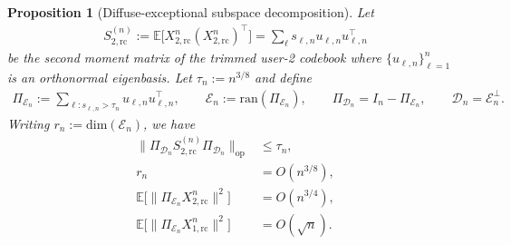 \documentclass[11pt,onecolumn]{IEEEtran}
\newcommand{\calD}{\mathcal{D}}
\newcommand{\calE}{\mathcal{E}}
\newcommand{\bbE}{\mathbb{E}}
\newtheorem{proposition}[theorem]{Proposition}
\newcommand{\rc}{\mathrm{rc}}
\begin{document}
\begin{proposition}[Diffuse-exceptional subspace decomposition] \label{prop:diffuse_exc}
    Let 
    \begin{align}
    S_{2,\rc}^{(n)} := \bbE\big[X_{2,\rc}^n(X_{2,\rc}^n)^\top\big]=\sum_\ell s_{\ell,n}u_{\ell,n}u_{\ell,n}^\top    
    \end{align}
    be the second moment matrix of the trimmed user-2 codebook  where $\{u_{\ell,n}\}_{\ell=1}^n$ is an orthonormal eigenbasis. Let $\tau_n:=n^{3/8}$ and define 
    \begin{align}
        \Pi_{\calE_n}:=\sum_{\ell : s_{\ell,n}> \tau_n}u_{\ell,n}u_{\ell,n}^\top,\qquad \calE_n:=\mathrm{ran}(\Pi_{\calE_n}),\qquad \Pi_{\calD_n}=I_n-\Pi_{\calE_n},\qquad \calD_n=\calE_n^\perp.
    \end{align}
    Writing $r_n :=\mathrm{dim}(\calE_n)$, we have
    \begin{align}
        \| \Pi_{\calD_n}S_{2,\rc}^{(n)} \Pi_{\calD_n}\|_{\mathrm{op}} &\le\tau_n ,\label{eqn:bound_by_tau}\\
        r_n &=O(n^{3/8}),\label{eqn:bound_rn}\\
        \bbE \big[ \|\Pi_{\calE_n}X_{2,\rc}^n\|^2\big] &= O(n^{3/4}) ,\label{eqn:X2onE}\\
\bbE \big[ \|\Pi_{\calE_n}X_{1,\rc}^n\|^2\big] &= O(\sqrt{n}) . \label{eqn:X1onE}
    \end{align}
\end{proposition}
\end{document}
